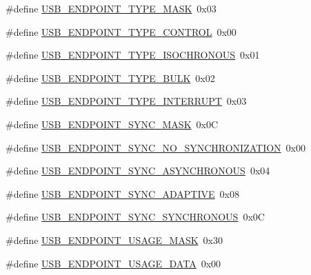 \begin{DoxyCompactItemize}
\item 
\#define \hyperlink{group__USBD__Core_gacd114fdf068aaa69407358ee5ccfd170}{U\-S\-B\-\_\-\-E\-N\-D\-P\-O\-I\-N\-T\-\_\-\-T\-Y\-P\-E\-\_\-\-M\-A\-S\-K}~0x03
\item 
\#define \hyperlink{group__USBD__Core_ga6a51ed22b06e5ca0f76a35b6bac8d73a}{U\-S\-B\-\_\-\-E\-N\-D\-P\-O\-I\-N\-T\-\_\-\-T\-Y\-P\-E\-\_\-\-C\-O\-N\-T\-R\-O\-L}~0x00
\item 
\#define \hyperlink{group__USBD__Core_gab05aae4a5d079b8dfb6a9cb1325ea6e5}{U\-S\-B\-\_\-\-E\-N\-D\-P\-O\-I\-N\-T\-\_\-\-T\-Y\-P\-E\-\_\-\-I\-S\-O\-C\-H\-R\-O\-N\-O\-U\-S}~0x01
\item 
\#define \hyperlink{group__USBD__Core_gaf4bac84d4576dc8f74f39dc75749e3dc}{U\-S\-B\-\_\-\-E\-N\-D\-P\-O\-I\-N\-T\-\_\-\-T\-Y\-P\-E\-\_\-\-B\-U\-L\-K}~0x02
\item 
\#define \hyperlink{group__USBD__Core_ga2cb5aa69a03df20aab217b808ad692a6}{U\-S\-B\-\_\-\-E\-N\-D\-P\-O\-I\-N\-T\-\_\-\-T\-Y\-P\-E\-\_\-\-I\-N\-T\-E\-R\-R\-U\-P\-T}~0x03
\item 
\#define \hyperlink{group__USBD__Core_ga91301868eb0b52506fc9bc02b131f783}{U\-S\-B\-\_\-\-E\-N\-D\-P\-O\-I\-N\-T\-\_\-\-S\-Y\-N\-C\-\_\-\-M\-A\-S\-K}~0x0\-C
\item 
\#define \hyperlink{group__USBD__Core_ga7733e58f8c4fbcef1533eb02f375aeb0}{U\-S\-B\-\_\-\-E\-N\-D\-P\-O\-I\-N\-T\-\_\-\-S\-Y\-N\-C\-\_\-\-N\-O\-\_\-\-S\-Y\-N\-C\-H\-R\-O\-N\-I\-Z\-A\-T\-I\-O\-N}~0x00
\item 
\#define \hyperlink{group__USBD__Core_gad1bb5cc537ea61634cb61c8c364c9a6f}{U\-S\-B\-\_\-\-E\-N\-D\-P\-O\-I\-N\-T\-\_\-\-S\-Y\-N\-C\-\_\-\-A\-S\-Y\-N\-C\-H\-R\-O\-N\-O\-U\-S}~0x04
\item 
\#define \hyperlink{group__USBD__Core_gaa7808914116fe45223462e68d6f8aa5d}{U\-S\-B\-\_\-\-E\-N\-D\-P\-O\-I\-N\-T\-\_\-\-S\-Y\-N\-C\-\_\-\-A\-D\-A\-P\-T\-I\-V\-E}~0x08
\item 
\#define \hyperlink{group__USBD__Core_ga0309c68623fb48fdc621f15dabc579f2}{U\-S\-B\-\_\-\-E\-N\-D\-P\-O\-I\-N\-T\-\_\-\-S\-Y\-N\-C\-\_\-\-S\-Y\-N\-C\-H\-R\-O\-N\-O\-U\-S}~0x0\-C
\item 
\#define \hyperlink{group__USBD__Core_ga834006343743238a5eb1d273ef3226ae}{U\-S\-B\-\_\-\-E\-N\-D\-P\-O\-I\-N\-T\-\_\-\-U\-S\-A\-G\-E\-\_\-\-M\-A\-S\-K}~0x30
\item 
\#define \hyperlink{group__USBD__Core_gac852b5e62e4e577b1b43239ae190908a}{U\-S\-B\-\_\-\-E\-N\-D\-P\-O\-I\-N\-T\-\_\-\-U\-S\-A\-G\-E\-\_\-\-D\-A\-T\-A}~0x00

\end{DoxyCompactItemize}
